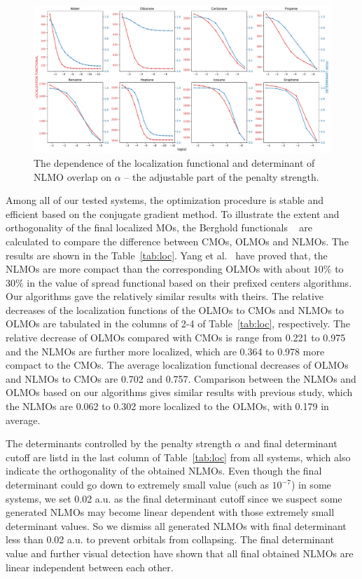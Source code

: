 \documentclass[aps,prl,reprint,amsmath,amssymb]{revtex4-1}
\begin{document}
\begin{figure}[hbpt]
\centering
\includegraphics[width=\textwidth]{figure_2.pdf}
\caption{The dependence of the localization functional and determinant of NLMO overlap on $\alpha$ -- the adjustable part of the penalty strength.}
\label{fig:alpha}
\end{figure}


Among all of our tested systems, the optimization procedure is stable and efficient based on the conjugate gradient method. 
To illustrate the extent and orthogonality of the final localized MOs, the Berghold functionals ~\cite{berghold2000general}  are calculated to compare the difference between CMOs, OLMOs and NLMOs.
The results are shown in the Table~\ref{tab:loc}.
Yang et al.~\cite{feng2004An_efficient, cui2010efficient} have proved that, the NLMOs are more compact than the corresponding OLMOs with about $10\%$ to $30\%$ in the value of spread functional based on their prefixed centers algorithms.
Our algorithms gave the relatively similar results with theirs.
The relative decreases of the localization functions of the OLMOs to CMOs and NLMOs to OLMOs are tabulated in the columns of 2-4 of Table~\ref{tab:loc}, respectively.
The relative decrease of OLMOs compared with CMOs is range from 0.221 to 0.975 and the NLMOs are further  more localized, which are 0.364 to 0.978 more compact to the CMOs.
The average  localization functional decreases of OLMOs and NLMOs to CMOs are 0.702 and 0.757.
Comparison between the NLMOs and OLMOs based on our algorithms gives similar results with previous study, which the NLMOs are 0.062 to 0.302 more localized to the OLMOs, with 0.179 in average.


The determinants controlled by the penalty strength $\alpha$ and final determinant cutoff are listd in the last column of Table~\ref{tab:loc} from all systems, which also indicate the orthogonality of the obtained NLMOs.
Even though the final determinant could go down to extremely small value (such as $10^{-7}$) in some systems, we set 0.02 a.u. as the final determinant cutoff since we suspect some generated NLMOs may become linear dependent with those extremely small determinant values.
So we dismiss all generated NLMOs with final determinant less than 0.02 a.u. to prevent orbitals from collapsing.
The final determinant value and further visual detection have shown that all final obtained NLMOs are linear independent between each other.
\end{document}
